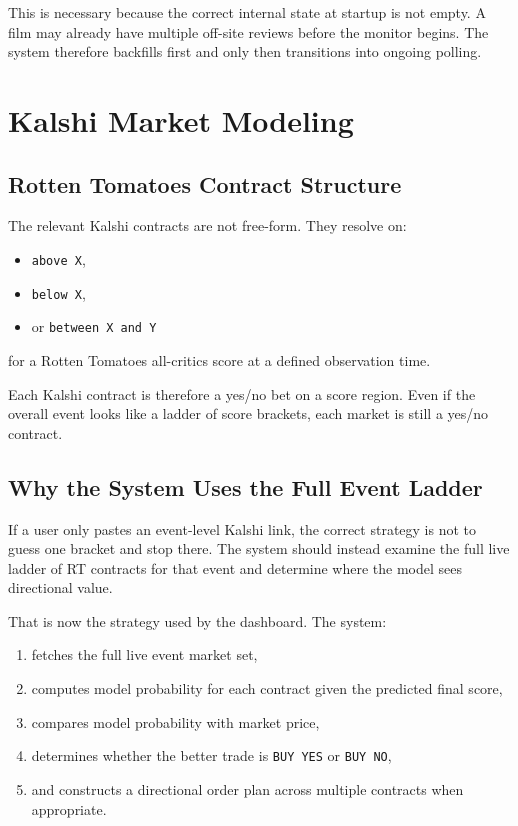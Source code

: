 \documentclass[11pt]{article}
\begin{document}
This is necessary because the correct internal state at startup is not empty. A film may already have multiple off-site reviews before the monitor begins. The system therefore backfills first and only then transitions into ongoing polling.

\section{Kalshi Market Modeling}
\subsection{Rotten Tomatoes Contract Structure}
The relevant Kalshi contracts are not free-form. They resolve on:
\begin{itemize}[leftmargin=1.5em]
    \item \texttt{above X},
    \item \texttt{below X},
    \item or \texttt{between X and Y}
\end{itemize}
for a Rotten Tomatoes all-critics score at a defined observation time.

Each Kalshi contract is therefore a yes/no bet on a score region. Even if the overall event looks like a ladder of score brackets, each market is still a yes/no contract.

\subsection{Why the System Uses the Full Event Ladder}
If a user only pastes an event-level Kalshi link, the correct strategy is not to guess one bracket and stop there. The system should instead examine the full live ladder of RT contracts for that event and determine where the model sees directional value.

That is now the strategy used by the dashboard. The system:
\begin{enumerate}[leftmargin=1.5em]
    \item fetches the full live event market set,
    \item computes model probability for each contract given the predicted final score,
    \item compares model probability with market price,
    \item determines whether the better trade is \texttt{BUY YES} or \texttt{BUY NO},
    \item and constructs a directional order plan across multiple contracts when appropriate.
\end{enumerate}
\end{document}
